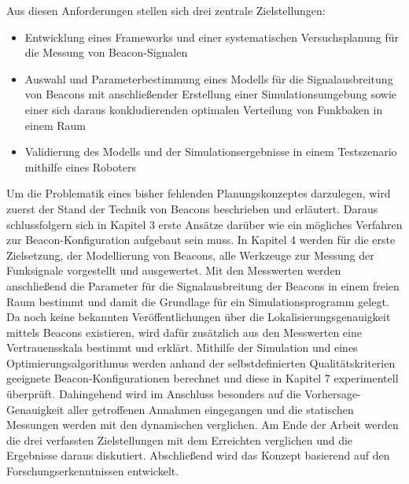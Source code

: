 Aus diesen Anforderungen stellen sich drei zentrale Zielstellungen:
\begin{itemize}
\item Entwicklung eines Frameworks und einer systematischen Versuchsplanung für die Messung von Beacon-Signalen
\item Auswahl und Parameterbestimmung eines Modells für die Signalausbreitung von Beacons mit anschließender Erstellung einer Simulationsumgebung sowie einer sich daraus konkludierenden optimalen Verteilung von Funkbaken in einem Raum 
\item Validierung des Modells und der Simulationsergebnisse in einem Testszenario mithilfe eines Roboters  
\end{itemize}
Um die Problematik eines bisher fehlenden Planungskonzeptes darzulegen, wird zuerst der Stand der Technik von Beacons beschrieben und erläutert. Daraus schlussfolgern sich in Kapitel 3 erste Ansätze darüber wie ein mögliches Verfahren zur Beacon-Konfiguration aufgebaut sein muss. In Kapitel 4 werden für die erste Zielsetzung, der Modellierung von Beacons, alle Werkzeuge zur Messung der Funksignale vorgestellt und ausgewertet. Mit den Messwerten werden anschließend die Parameter für die Signalausbreitung der Beacons in einem freien Raum bestimmt und damit die Grundlage für ein Simulationsprogramm gelegt. Da noch keine bekannten Veröffentlichungen über die Lokalisierungsgenauigkeit mittels Beacons existieren, wird dafür zusätzlich aus den Messwerten eine Vertrauensskala bestimmt und erklärt. Mithilfe der Simulation und eines Optimierungsalgorithmus werden anhand der selbstdefinierten Qualitätskriterien geeignete Beacon-Konfigurationen berechnet und diese in Kapitel 7 experimentell überprüft. Dahingehend wird im Anschluss besonders auf die Vorhersage-Genauigkeit aller getroffenen Annahmen eingegangen und die statischen Messungen werden mit den dynamischen verglichen. Am Ende der Arbeit werden die drei verfassten Zielstellungen mit dem Erreichten verglichen und die Ergebnisse daraus diskutiert. Abschließend wird das Konzept basierend auf den Forschungserkenntnissen entwickelt. 
 






